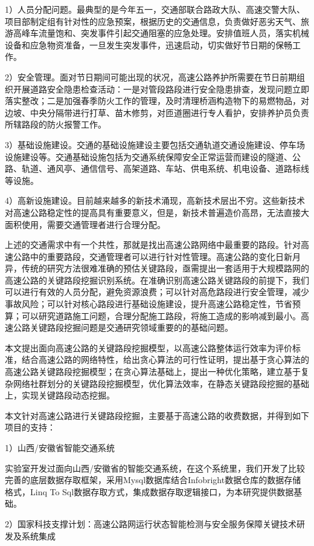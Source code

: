 1）人员分配问题。最典型的是今年五一，交通部联合路政大队、高速交警大队、项目部制定组有针对性的应急预案，根据历史的交通信息，负责做好恶劣天气、旅游高峰车流量饱和、突发事件引起交通阻塞的应急处理。安排值班人员，落实机械设备和应急物资准备，一旦发生突发事件，迅速启动，切实做好节日期的保畅工作。

2）安全管理。面对节日期间可能出现的状况，高速公路养护所需要在节日前期组织开展道路安全隐患检查活动：一是对管段路段进行安全隐患排查，发现问题立即落实整改；二是加强春季防火工作的管理，及时清理桥涵构造物下的易燃物品，对边坡、中央分隔带进行打草、苗木修剪，对匝道圈进行专人看护，安排养护员负责所辖路段的防火报警工作。

3）基础设施建设。交通的基础设施建设主要包括交通轨道交通设施建设、停车场设施建设等。交通基础设施包括为交通系统保障安全正常运营而建设的隧道、公路、轨道、通风亭、通信信号、高架道路、车站、供电系统、机电设备、道路标线等设施。

4）高新设施建设。目前越来越多的新技术涌现，高新技术层出不穷\parencite{ysk2017qx}。这些新技术对高速公路稳定性的提高具有重要意义，但是，新技术普遍造价高昂，无法直接大面积使用，需要交通管理者进行合理分配。

上述的交通需求中有一个共性，那就是找出高速公路网络中最重要的路段。针对高速公路中的重要路段，交通管理者可以进行针对性管理。高速公路的变化日新月异，传统的研究方法很难准确的预估关键路段，亟需提出一套适用于大规模路网的高速公路的关键路段挖掘识别系统。在准确识别高速公路关键路段的前提下，我们可以进行有效的人员分配，避免资源浪费；可以针对高危路段进行安全管理，减少事故风险；可以针对核心路段进行基础设施建设，提升高速公路稳定性，节省预算；可以研究道路施工问题，合理分配施工路段，将施工造成的影响减到最小。高速公路关键路段挖掘问题是交通研究领域重要的的基础问题。

本文提出面向高速公路的关键路段挖掘模型，以高速公路整体运行效率为评价标准，结合高速公路的网络特性，给出贪心算法的可行性证明，提出基于贪心算法的高速公路关键路段挖掘模型；在贪心算法基础上，提出一种优化策略，建立基于复杂网络社群划分的关键路段挖掘模型，优化算法效率，在静态关键路段挖掘的基础上，实现关键路段动态挖掘。

本文针对高速公路进行关键路段挖掘，主要基于高速公路的收费数据，并得到如下项目的支持：

1）山西/安徽省智能交通系统

	实验室开发过面向山西/安徽省的智能交通系统，在这个系统里，我们开发了比较完善的底层数据存取框架，采用Mysql数据库结合Infobright数据仓库的数据存储格式，Linq To Sql数据存取方式，集成数据存取逻辑接口，为本研究提供数据基础。

2）国家科技支撑计划：高速公路网运行状态智能检测与安全服务保障关键技术研发及系统集成
	

